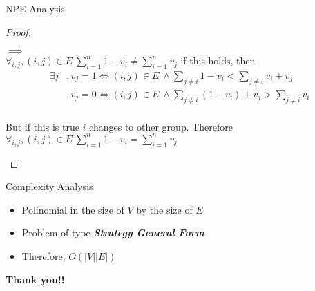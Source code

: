 \documentclass{beamer}
\begin{document}
\begin{frame}[fragile]{NPE Analysis}
\begin{proof}
\begin{proofpart}
  $\implies$\\
  $\forall_{i,j}, (i,j) \in E\ \sum_{i=1}^n 1 - v_i \neq \sum_{i=1}^n v_j$ if this holds, then \newline
  \begin{subequations}
    \begin{align}
       \exists j &, v_j = 1 \iff (i,j) \in E\ \land \sum_{j \neq i} 1 - v_i < \sum_{j \neq i} v_i + v_j\\
                 &, v_j = 0 \iff (i,j) \in E\ \land \sum_{j \neq i} (1 - v_i)+v_j > \sum_{j \neq i} v_i\\
    \end{align}
  \end{subequations}
  
  But if this is true $i$ changes to other group.\newline
  Therefore $\forall_{i,j}, (i,j) \in E\ \sum_{i=1}^n 1 - v_i = \sum_{i=1}^n v_j$
  \end{proofpart}
  
  \end{proof}
\end{frame}

\begin{frame}[fragile]{Complexity Analysis}
  \begin{block}{}
    \begin{itemize}
      \item Polinomial in the size of $V$ by the size of $E$
      \item Problem of type \textbf{\textit{Strategy General Form}}
      \item Therefore, $O(|V||E|)$
    \end{itemize}
  \end{block}
\end{frame}

\begin{frame}
  \begin{center}
    \textbf{\huge{Thank you!!}}
    \end{center}
\end{frame}
\end{document}
